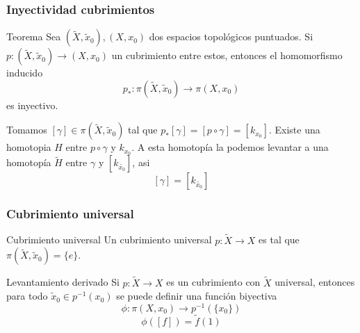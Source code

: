 \documentclass[xetex,mathserif,serif]{beamer}
\begin{document}
  \begin{frame}
    \frametitle{Inyectividad cubrimientos}
    \begin{block}{Teorema}
      Sea \(\left( \tilde X, \tilde x_0 \right), \left( X, x_0 \right)\)
      dos espacios topológicos puntuados. Si \(p : \left( \tilde X,
        \tilde x_0 \right) \to \left( X, x_0 \right)\) un cubrimiento
      entre estos, entonces el homomorfismo inducido
      \[ p_* : \pi \left( \tilde X, \tilde x_0 \right) \longrightarrow
        \pi \left( X, x_0 \right)\] es inyectivo.
    \end{block}
    \pause
    \begin{block}{}
      Tomamos \([\gamma] \in \pi(\tilde X, \tilde x_0)\) tal que \(p_*
      [\gamma] = [p \circ \gamma] = [k_{x_0}]\). Existe una homotopia
      \(H\) entre \(p \circ \gamma\) y \(k_{x_0}\). A esta homotopía la
      podemos levantar a una homotopía \(\tilde H\) entre \(\gamma\) y
      \([k_{\tilde {x_0}}]\), asi
      \[ [\gamma]= [k_{\tilde {x_0}}]\]
    \end{block}
  \end{frame}

  \begin{frame}
    \frametitle{Cubrimiento universal}
    \begin{block}{Cubrimiento universal}
      Un cubrimiento universal \(p : \tilde X \to X\) es tal que \(\pi
      (\tilde X, \tilde x_0) = \{e\}\).
    \end{block}

    \begin{block}{Levantamiento derivado}
      Si \(p : \tilde X \to X\) es un cubrimiento con \(\tilde X\)
      universal, entonces para todo \(\tilde x_0 \in p^{-1} (x_0)\) se
      puede definir una función biyectiva
      \[ \phi : \pi (X, x_0) \to p^{-1} (\{x_0\}) \]
      \[ \phi \left( [f] \right) = \tilde f (1) \]
    \end{block}
  \end{frame}
\end{document}
